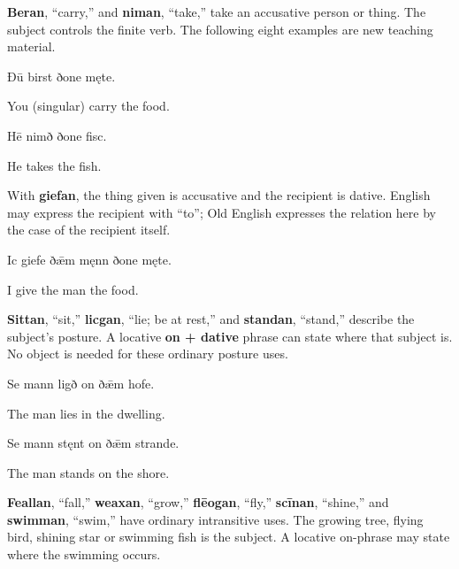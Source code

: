 \textbf{Beran}, “carry,” and \textbf{niman}, “take,” take an accusative person or thing. The subject controls the finite verb. The following eight examples are new teaching material.

Ðū birst ðone męte.

You (singular) carry the food.

Hē nimð ðone fisc.

He takes the fish.

With \textbf{giefan}, the thing given is accusative and the recipient is dative. English may express the recipient with “to”; Old English expresses the relation here by the case of the recipient itself.

Ic giefe ðǣm męnn ðone męte.

I give the man the food.

\textbf{Sittan}, “sit,” \textbf{licgan}, “lie; be at rest,” and \textbf{standan}, “stand,” describe the subject’s posture. A locative \textbf{on + dative} phrase can state where that subject is. No object is needed for these ordinary posture uses.

Se mann ligð on ðǣm hofe.

The man lies in the dwelling.

Se mann stęnt on ðǣm strande.

The man stands on the shore.

\textbf{Feallan}, “fall,” \textbf{weaxan}, “grow,” \textbf{flēogan}, “fly,” \textbf{scīnan}, “shine,” and \textbf{swimman}, “swim,” have ordinary intransitive uses. The growing tree, flying bird, shining star or swimming fish is the subject. A locative on-phrase may state where the swimming occurs.

